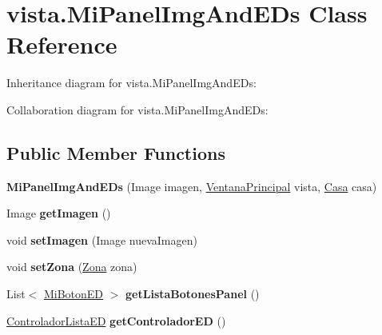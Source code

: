\hypertarget{classvista_1_1_mi_panel_img_and_e_ds}{}\section{vista.\+Mi\+Panel\+Img\+And\+E\+Ds Class Reference}
\label{classvista_1_1_mi_panel_img_and_e_ds}


Inheritance diagram for vista.\+Mi\+Panel\+Img\+And\+E\+Ds\+:


Collaboration diagram for vista.\+Mi\+Panel\+Img\+And\+E\+Ds\+:
\subsection*{Public Member Functions}
\begin{DoxyCompactItemize}
\item 
\mbox{\label{classvista_1_1_mi_panel_img_and_e_ds_a9a05707bd842a8c78a8b0c188f342ebc}} 
{\bfseries Mi\+Panel\+Img\+And\+E\+Ds} (Image imagen, \mbox{\hyperlink{classvista_1_1_ventana_principal}{Ventana\+Principal}} vista, \mbox{\hyperlink{classmodelo_1_1_casa}{Casa}} casa)
\item 
\mbox{\label{classvista_1_1_mi_panel_img_and_e_ds_ad6fe7d3e2ceb875550c2933a2fb4a03b}} 
Image {\bfseries get\+Imagen} ()
\item 
\mbox{\label{classvista_1_1_mi_panel_img_and_e_ds_a25e4fda0b1fd6e037498c3478478018a}} 
void {\bfseries set\+Imagen} (Image nueva\+Imagen)
\item 
\mbox{\label{classvista_1_1_mi_panel_img_and_e_ds_a4b474e495661a6c188a2ea5aceabab61}} 
void {\bfseries set\+Zona} (\mbox{\hyperlink{classmodelo_1_1_zona}{Zona}} zona)
\item 
\mbox{\label{classvista_1_1_mi_panel_img_and_e_ds_af761a5a5e1f4ba64e828bdfbda12f20d}} 
List$<$ \mbox{\hyperlink{classvista_1_1_mi_boton_e_d}{Mi\+Boton\+ED}} $>$ {\bfseries get\+Lista\+Botones\+Panel} ()
\item 
\mbox{\label{classvista_1_1_mi_panel_img_and_e_ds_a6a3da428a1236e42368d53842486ff3f}} 
\mbox{\hyperlink{classcontrolador_1_1_controlador_lista_e_d}{Controlador\+Lista\+ED}} {\bfseries get\+Controlador\+ED} ()
\end{DoxyCompactItemize}
